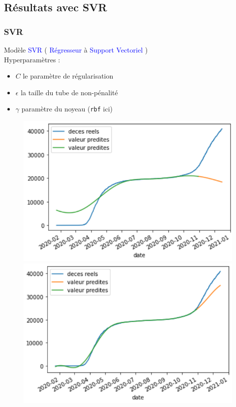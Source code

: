 \documentclass{beamer}[aspectratio = 43]
\begin{document}
\subsection*{Résultats avec SVR}
\begin{frame}
	\frametitle{SVR}
	Modèle \textcolor{blue}{SVR} ( \textcolor{blue}{Régresseur} à \textcolor{blue}{Support Vectoriel} )%
	\\
	Hyperparamètres :
	\begin{itemize}
		\item[]$C$ le paramètre de régularisation
		\item[]$\epsilon$ la taille du tube de \og non-pénalité \fg
		\item[]$\gamma$ paramètre du noyeau (\texttt{rbf} ici)
	\end{itemize}
	\begin{figure}[h]
		\centering
		\begin{minipage}{0.5\textwidth}
			\includegraphics[scale=0.4]{svr100_}
		\end{minipage}%
		\begin{minipage}{0.5\textwidth}
			\includegraphics[scale=0.4]{svr100000_}

\end{minipage}
\end{figure}
\end{frame}
\end{document}
